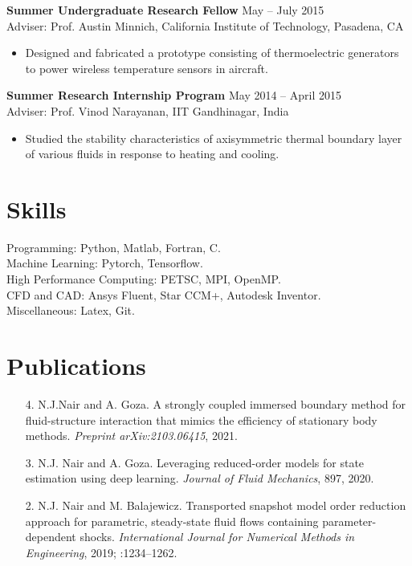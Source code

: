 \documentclass[margin]{res}
\begin{document}
\begin{resume}
{\bf Summer Undergraduate Research Fellow} \hfill May -- July 2015\\
Adviser: Prof. Austin Minnich, California Institute of Technology, Pasadena, CA
\begin{itemize}
\item Designed and fabricated a prototype consisting of thermoelectric generators to
power wireless temperature sensors in aircraft.
\end{itemize}

{\bf Summer Research Internship Program} \hfill   May 2014 -- April 2015\\
Adviser: Prof. Vinod Narayanan, IIT Gandhinagar, India
\begin{itemize}
\item Studied the stability characteristics of axisymmetric thermal boundary layer of various fluids in response to heating and cooling.
\end{itemize}


\section{\large Skills}		 
Programming: Python, Matlab, Fortran, C.\\
Machine Learning: Pytorch, Tensorflow.\\
High Performance Computing: PETSC, MPI, OpenMP.\\
CFD and CAD: Ansys Fluent, Star CCM+, Autodesk Inventor.\\ 
Miscellaneous: Latex, Git.

\section{\large Publications}
 \begin{itemize}
 
 \item[4.] N.J.Nair and A. Goza. A strongly coupled immersed boundary method for fluid-structure interaction that mimics the efficiency of stationary body methods. \textit{Preprint arXiv:2103.06415}, 2021.
 
 \item[3.] N.J. Nair and A. Goza. Leveraging reduced-order models for state estimation using deep learning. \textit{Journal of Fluid Mechanics}, 897, 2020.
 
 \item[2.] N.J. Nair and M. Balajewicz. Transported snapshot model order reduction approach for parametric, steady-state fluid flows containing parameter-dependent shocks. \textit{International Journal for Numerical Methods in Engineering}, 2019; :1234–1262.
 

\end{itemize}
\end{resume}
\end{document}
